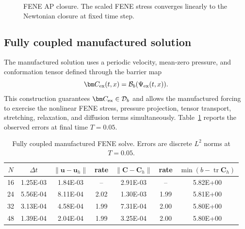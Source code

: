 ﻿\documentclass[11pt]{amsart}
\newcommand{\CC}{\bm C}
\newcommand{\DD}{\bm D}
\newcommand{\SSS}{\bm S}
\newcommand{\uu}{\bm u}
\newcommand{\Wi}{\mathrm{Wi}}
\newcommand{\calD}{\mathcal D}
\newcommand{\tr}{\operatorname{tr}}
\begin{document}
\begin{figure}[htbp]
\centering
{}
\caption{FENE AP closure.  The scaled FENE stress converges linearly to the Newtonian closure at fixed time step.}
\label{fig:ap-fene}
\end{figure}

\subsection{Fully coupled manufactured solution}

The manufactured solution uses a periodic velocity, mean-zero pressure, and conformation tensor defined through the barrier map
\[
  \CC_{\rm ex}(t,x)=\mathcal B_b(\Psi_{\rm ex}(t,x)).
\]
This construction guarantees $\CC_{\rm ex}\in\calD_b$ and allows the manufactured forcing to exercise the nonlinear FENE stress, pressure projection, tensor transport, stretching, relaxation, and diffusion terms simultaneously.  Table~\ref{tab:manufactured-fene} reports the observed errors at final time $T=0.05$.

\begin{table}[htbp]
\centering
\caption{Fully coupled manufactured FENE solve.  Errors are discrete $L^2$ norms at $T=0.05$.}
\label{tab:manufactured-fene}
\small
\begin{tabular}{ccccccc}
\toprule
$N$ & $\Delta t$ & $\|\uu-\uu_h\|$ & rate & $\|\CC-\CC_h\|$ & rate & $\min(b-\tr\CC_h)$ \\
\midrule
16 & 1.25E-03 & 1.84E-03 & -- & 2.91E-03 & -- & 5.82E+00 \\
24 & 5.56E-04 & 8.11E-04 & 2.02 & 1.30E-03 & 1.99 & 5.81E+00 \\
32 & 3.13E-04 & 4.58E-04 & 1.99 & 7.31E-04 & 2.00 & 5.80E+00 \\
48 & 1.39E-04 & 2.04E-04 & 1.99 & 3.25E-04 & 2.00 & 5.80E+00 \\
\bottomrule
\end{tabular}
\end{table}
\end{document}
